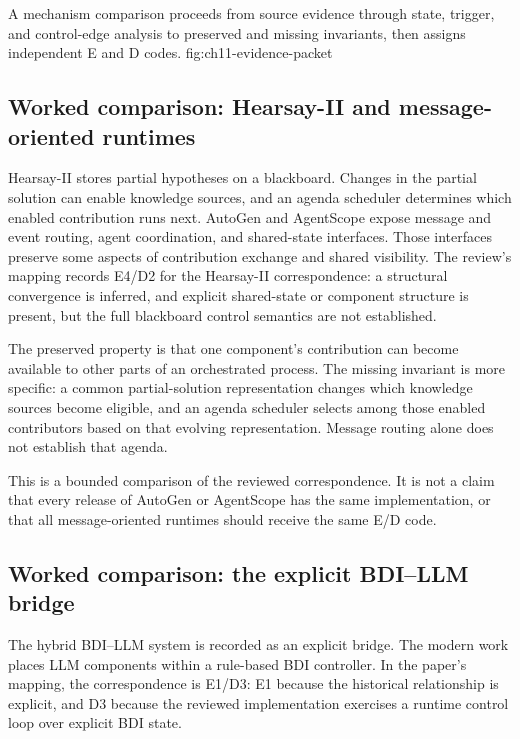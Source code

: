   {A mechanism comparison proceeds from source evidence through state, trigger, and control-edge analysis to preserved and missing invariants, then assigns independent E and D codes.}
  {fig:ch11-evidence-packet}

\subsection{Worked comparison: Hearsay-II and message-oriented runtimes}

Hearsay-II stores partial hypotheses on a blackboard. Changes in the partial solution can enable knowledge sources, and an agenda scheduler determines which enabled contribution runs next. AutoGen and AgentScope expose message and event routing, agent coordination, and shared-state interfaces. Those interfaces preserve some aspects of contribution exchange and shared visibility. The review's mapping records E4/D2 for the Hearsay-II correspondence: a structural convergence is inferred, and explicit shared-state or component structure is present, but the full blackboard control semantics are not established.

The preserved property is that one component's contribution can become available to other parts of an orchestrated process. The missing invariant is more specific: a common partial-solution representation changes which knowledge sources become eligible, and an agenda scheduler selects among those enabled contributors based on that evolving representation. Message routing alone does not establish that agenda.

This is a bounded comparison of the reviewed correspondence. It is not a claim that every release of AutoGen or AgentScope has the same implementation, or that all message-oriented runtimes should receive the same E/D code.

\subsection{Worked comparison: the explicit BDI--LLM bridge}

The hybrid BDI--LLM system is recorded as an explicit bridge. The modern work places LLM components within a rule-based BDI controller. In the paper's mapping, the correspondence is E1/D3: E1 because the historical relationship is explicit, and D3 because the reviewed implementation exercises a runtime control loop over explicit BDI state.

